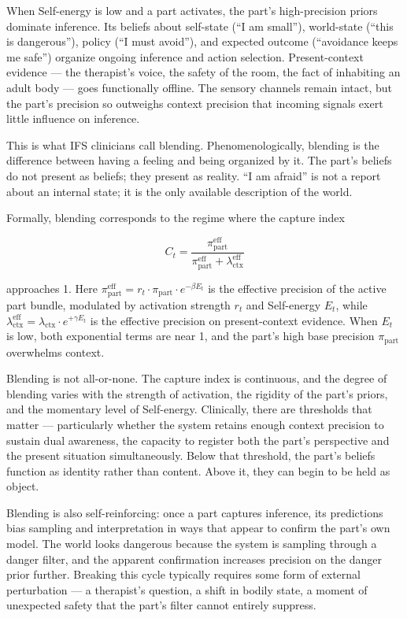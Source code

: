 \documentclass[11pt]{article}
\begin{document}
When Self-energy is low and a part activates, the part's high-precision
priors dominate inference. Its beliefs about self-state (``I am
small''), world-state (``this is dangerous''), policy (``I must
avoid''), and expected outcome (``avoidance keeps me safe'') organize
ongoing inference and action selection. Present-context evidence --- the
therapist's voice, the safety of the room, the fact of inhabiting an
adult body --- goes functionally offline. The sensory channels remain
intact, but the part's precision so outweighs context precision that
incoming signals exert little influence on inference.

This is what IFS clinicians call blending. Phenomenologically, blending
is the difference between having a feeling and being organized by it.
The part's beliefs do not present as beliefs; they present as reality.
``I am afraid'' is not a report about an internal state; it is the only
available description of the world.

Formally, blending corresponds to the regime where the capture index

\[C_t = \frac{\pi_{\text{part}}^{\text{eff}}}{\pi_{\text{part}}^{\text{eff}} + \lambda_{\text{ctx}}^{\text{eff}}}\]

approaches 1. Here
\(\pi_{\text{part}}^{\text{eff}} = r_t \cdot \pi_{\text{part}} \cdot e^{-\beta E_t}\)
is the effective precision of the active part bundle, modulated by
activation strength \(r_t\) and Self-energy \(E_t\), while
\(\lambda_{\text{ctx}}^{\text{eff}} = \lambda_{\text{ctx}} \cdot e^{+\gamma E_t}\)
is the effective precision on present-context evidence. When \(E_t\) is
low, both exponential terms are near 1, and the part's high base
precision \(\pi_{\text{part}}\) overwhelms context.

Blending is not all-or-none. The capture index is continuous, and the
degree of blending varies with the strength of activation, the rigidity
of the part's priors, and the momentary level of Self-energy.
Clinically, there are thresholds that matter --- particularly whether
the system retains enough context precision to sustain dual awareness,
the capacity to register both the part's perspective and the present
situation simultaneously. Below that threshold, the part's beliefs
function as identity rather than content. Above it, they can begin to be
held as object.

Blending is also self-reinforcing: once a part captures inference, its
predictions bias sampling and interpretation in ways that appear to
confirm the part's own model. The world looks dangerous because the
system is sampling through a danger filter, and the apparent
confirmation increases precision on the danger prior further. Breaking
this cycle typically requires some form of external perturbation --- a
therapist's question, a shift in bodily state, a moment of unexpected
safety that the part's filter cannot entirely suppress.
\end{document}
